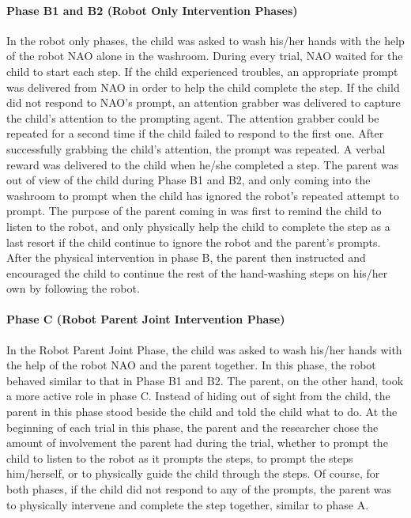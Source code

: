 \paragraph{Phase B1 and B2 (Robot Only Intervention Phases)}
In the robot only phases, the child was asked to wash his/her hands with the help of the robot NAO alone in the washroom. During every trial, NAO waited for the child to start each step. If the child experienced troubles, an appropriate prompt was delivered from NAO in order to help the child complete the step. If the child did not respond to NAO's prompt, an attention grabber was delivered to capture the child's attention to the prompting agent. The attention grabber could be repeated for a second time if the child failed to respond to the first one.  After successfully grabbing the child's attention, the prompt was repeated.  A verbal reward was delivered to the child when he/she completed a step.  The parent was out of view of the child during Phase B1 and B2, and only coming into the washroom to prompt when the child has ignored the robot's repeated attempt to prompt.  The purpose of the parent coming in was first to remind the child to listen to the robot, and only physically help the child to complete the step as a last resort if the child continue to ignore the robot and the parent's prompts.  After the physical intervention in phase B, the parent then instructed and encouraged the child to continue the rest of the hand-washing steps on his/her own by following the robot.


\paragraph{Phase C (Robot Parent Joint Intervention Phase)}
In the Robot Parent Joint Phase, the child was asked to wash his/her hands with the help of the robot NAO and the parent together.  In this phase, the robot behaved similar to that in Phase B1 and B2.  The parent, on the other hand, took a more active role in phase C.  Instead of hiding out of sight from the child, the parent in this phase stood beside the child and told the child what to do.  At the beginning of each trial in this phase, the parent and the researcher chose the amount of involvement the parent had during the trial, whether to prompt the child to listen to the robot as it prompts the steps, to prompt the steps him/herself, or to physically guide the child through the steps.  Of course, for both phases, if the child did not respond to any of the prompts, the parent was to physically intervene and complete the step together, similar to phase A.

